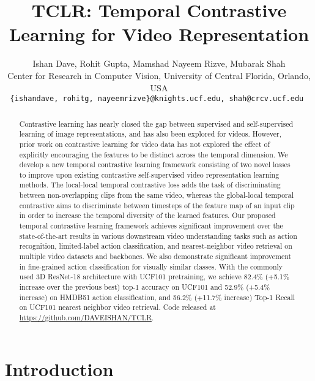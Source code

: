 \documentclass[10pt,twocolumn,letterpaper]{article}
\begin{document}
\title{\textbf{TCLR}: Temporal Contrastive Learning for Video Representation}

\author{Ishan Dave, Rohit Gupta, Mamshad Nayeem Rizve, Mubarak Shah\\
Center for Research in Computer Vision, University of Central Florida, Orlando, USA\\
\tt\small \{ishandave, rohitg, nayeemrizve\}@knights.ucf.edu, shah@crcv.ucf.edu
}

\maketitle

\begin{abstract}
Contrastive learning has nearly closed the gap between supervised and self-supervised learning of image representations, and has also been explored for videos. However, prior work on contrastive learning for video data has not explored the effect of explicitly encouraging the features to be distinct across the temporal dimension. We develop a new temporal contrastive learning framework consisting of two novel losses to improve upon existing contrastive self-supervised video representation learning methods. The local-local temporal contrastive loss adds the task of discriminating between non-overlapping clips from the same video, whereas the global-local temporal contrastive aims to discriminate between timesteps of the feature map of an input clip in order to increase the temporal diversity of the learned features. Our proposed temporal contrastive learning framework achieves significant improvement over the state-of-the-art results in various downstream video understanding tasks such as action recognition, limited-label action classification, and nearest-neighbor video retrieval on multiple video datasets and backbones. We also demonstrate significant improvement in fine-grained action classification for visually similar classes. With the commonly used 3D ResNet-18 architecture with UCF101 pretraining, we achieve 82.4\% (+5.1\% increase over the previous best) top-1 accuracy on UCF101 and 52.9\% (+5.4\% increase) on HMDB51 action classification, and 56.2\% (+11.7\% increase) Top-1 Recall on UCF101 nearest neighbor video retrieval. Code released at \url{https://github.com/DAVEISHAN/TCLR}.
\end{abstract}


\section{Introduction}
\vspace{-1mm}
\end{document}
